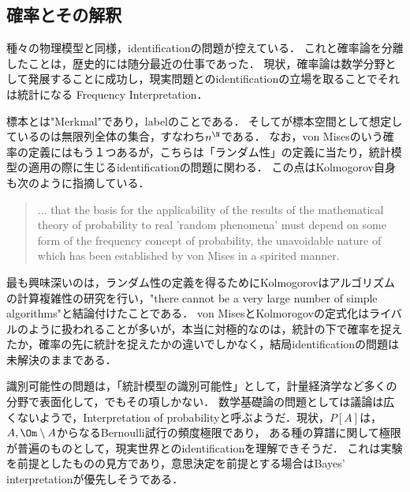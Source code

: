 \documentclass[uplatex,dvipdfmx]{jsreport}
\begin{document}
\subsection{確率とその解釈}

\begin{tcolorbox}[colframe=ForestGreen, colback=ForestGreen!10!white,breakable,colbacktitle=ForestGreen!40!white,coltitle=black,fonttitle=\bfseries\sffamily,
title=]
    種々の物理模型と同様，identificationの問題が控えている．
    これと確率論を分離したことは，歴史的には随分最近の仕事であった．
    現状，確率論は数学分野として発展することに成功し，現実問題とのidentificationの立場を取ることでそれは統計になる\cite{EncyclopediaOfStatisticalScience} Frequency Interpretation．
\end{tcolorbox}

\begin{remark}[確率とそのidentificationの問題の分離]
    標本とは"Merkmal"であり，labelのことである．
    そして\cite{vonMises19}が標本空間として想定しているのは無限列全体の集合，すなわち$n^\N$である．
    なお，von Misesのいう確率の定義にはもう１つあるが，こちらは「ランダム性」の定義に当たり，統計模型の適用の際に生じるidentificationの問題に関わる．
    この点はKolmogorov自身も次のように指摘している．
    \begin{quote}
        ... that the basis for the applicability of the results of the mathematical theory of probability to real 'random phenomena' must depend on some form of the frequency concept of probability, the unavoidable nature of which has been established by von Mises in a spirited manner. \cite{Kolmogorov63-RandomNumbers}
    \end{quote}
    最も興味深いのは，ランダム性の定義を得るためにKolmogorovはアルゴリズムの計算複雑性の研究を行い，"there cannot be a very large number of simple algorithms"と結論付けたことである．
    von MisesとKolmorogovの定式化はライバルのように扱われることが多いが，本当に対極的なのは，統計の下で確率を捉えたか，確率の先に統計を捉えたかの違いでしかなく，結局identificationの問題は未解決のままである．
\end{remark}

\begin{remark}
    識別可能性の問題は，「統計模型の識別可能性」として，計量経済学など多くの分野で表面化して，\cite{EncyclopediaOfStatisticalScience}でもその項しかない．
    数学基礎論の問題としては議論は広くないようで，Interpretation of probabilityと呼ぶようだ．現状，$P[A]$は，$A,\Om\setminus A$からなるBernoulli試行の頻度極限であり，
    ある種の算譜に関して極限が普遍のものとして，現実世界とのidentificationを理解できそうだ．
    これは実験を前提としたものの見方であり，意思決定を前提とする場合はBayes' interpretationが優先しそうである．
\end{remark}
\end{document}
